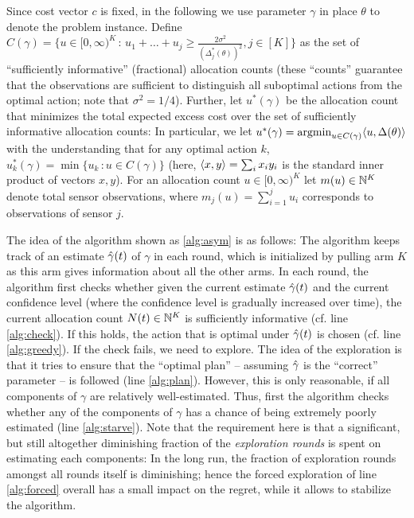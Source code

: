 Since cost vector $c$ is fixed, in the following we use parameter $\gamma$ in place $\theta$ to denote the problem instance.
Define $C(\gamma) = \{ u\in [0,\infty)^K\,:\, u_1 + \dots + u_j \ge \frac{2\sigma^2}{(\Delta_j^*(\theta))^2}, j\in [K] \}$
as the set of ``sufficiently informative'' (fractional)  allocation counts 
(these ``counts'' guarantee that the observations are sufficient to distinguish all suboptimal actions from the optimal action; note that $\sigma^2=1/4$).
Further, let $u^*(\gamma)$
be the allocation count that minimizes the total expected excess cost over the set of sufficiently informative allocation counts:
In particular,  we let $u^*(\gamma) = \operatorname{argmin}_{u\in C(\gamma)} \langle  u, \Delta(\theta)  \rangle$ 
with the understanding that for any optimal action $k$, $u_k^*(\gamma) = \min \{ u_k \,: u\in C(\gamma) \}$ (here, $\langle x,y \rangle = \sum_i x_i y_i$ is the standard inner product of vectors $x,y$).
For an allocation count $u\in [0,\infty)^K$ let $m(u)\in \mathbb{N}^K$ denote total sensor observations, where $m_j(u) = \sum_{i=1}^j u_i$ corresponds to observations of sensor $j$.

The idea of the algorithm shown as \cref{alg:asym} is as follows:
The algorithm keeps track of an estimate $\hat{\gamma}(t)$ of $\gamma$ in each round, which is initialized by pulling arm $K$ as this arm
gives information about all the other arms.
In each round, the algorithm first checks whether given the current estimate $\hat{\gamma}(t)$ and the current confidence level (where the confidence level is gradually increased over time), the current allocation count $N(t)\in \mathbb{N}^K$
is sufficiently informative (cf. line \ref{alg:check}). If this holds, the action that is optimal under $\hat{\gamma}(t)$ is chosen 
(cf. line \ref{alg:greedy}). If the check fails, we need to explore.
The idea of the exploration is that it tries to ensure that the ``optimal plan'' -- assuming $\hat{\gamma}$ is the ``correct'' parameter -- is followed (line \ref{alg:plan}). However, this is only reasonable, if all components of $\gamma$ are relatively well-estimated.
Thus, first the algorithm checks whether any of the components of $\gamma$ has a chance of being
extremely poorly estimated (line \ref{alg:starve}). Note that the requirement here is that a significant, but still altogether diminishing fraction of the \emph{exploration rounds} is spent on estimating each components: In the long run, the fraction of exploration rounds amongst all rounds itself is diminishing; hence the forced exploration of line \ref{alg:forced} overall has a small impact on the regret, while it allows to stabilize the algorithm.

